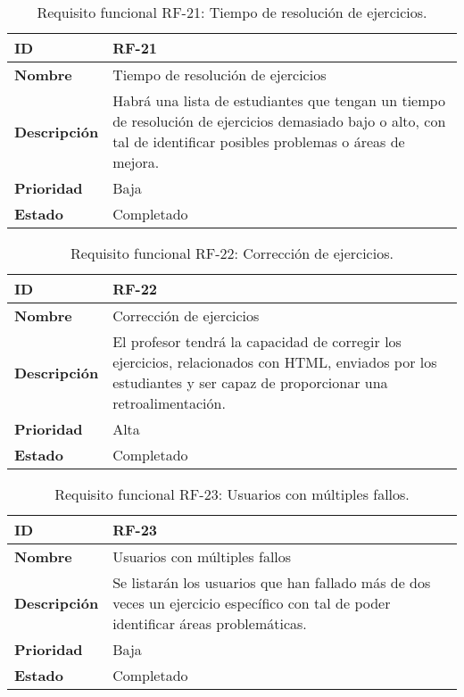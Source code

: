 \begin{table}[H]
    \centering
    \begin{tabular}{|l|p{9.5cm}|}
        \hline
        \textbf{ID} & RF-21\\
        \hline
        \textbf{Nombre} & Tiempo de resolución de ejercicios \\
        \hline
        \textbf{Descripción} & Habrá una lista de estudiantes que tengan un tiempo de resolución de ejercicios demasiado bajo o alto, con tal de identificar posibles problemas o áreas de mejora. \\
        \hline
        \textbf{Prioridad} & Baja \\
        \hline
        \textbf{Estado} & Completado \\
        \hline
    \end{tabular}
    \caption{Requisito funcional RF-21: Tiempo de resolución de ejercicios.}
    \label{table:req-RF00J}
\end{table}

\begin{table}[H]
    \centering
    \begin{tabular}{|l|p{9.5cm}|}
        \hline
        \textbf{ID} & RF-22 \\
        \hline
        \textbf{Nombre} & Corrección de ejercicios \\
        \hline
        \textbf{Descripción} & El profesor tendrá la capacidad de corregir los ejercicios, relacionados con HTML, enviados por los estudiantes y ser capaz de proporcionar una retroalimentación. \\
        \hline
        \textbf{Prioridad} & Alta \\
        \hline
        \textbf{Estado} & Completado \\
        \hline
    \end{tabular}
    \caption{Requisito funcional RF-22: Corrección de ejercicios.}
    \label{table:req-RF00K}
\end{table}

\begin{table}[H]
    \centering
    \begin{tabular}{|l|p{9.5cm}|}
        \hline
        \textbf{ID} & RF-23 \\
        \hline
        \textbf{Nombre} & Usuarios con múltiples fallos \\
        \hline
        \textbf{Descripción} & Se listarán los usuarios que han fallado más de dos veces un ejercicio específico con tal de poder identificar áreas problemáticas. \\
        \hline
        \textbf{Prioridad} & Baja \\
        \hline
        \textbf{Estado} & Completado \\
        \hline
    \end{tabular}
    \caption{Requisito funcional RF-23: Usuarios con múltiples fallos.}
    \label{table:req-RF00L}
\end{table}

